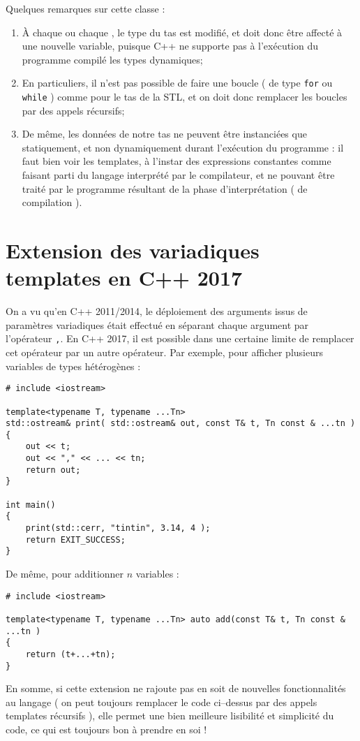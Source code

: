 \documentclass[a4]{article}
\begin{document}
Quelques remarques sur cette classe :
\begin{enumerate}
\item À chaque \verb@pop@ ou chaque \verb@push@, le type du tas est modifié, et doit donc être affecté à une nouvelle variable, puisque
C++ ne supporte pas à l'exécution du programme compilé les types dynamiques;
\item En particuliers, il n'est pas possible de faire une boucle ( de type \verb$for$ ou \verb$while$ ) comme pour le tas de la STL,
et on doit donc remplacer les boucles par des appels récursifs;
\item De même, les données de notre tas ne peuvent être instanciées que statiquement, et non dynamiquement durant l'exécution du programme :
il faut bien voir les templates, à l'instar des expressions constantes comme faisant parti du langage interprété par le compilateur, et ne
pouvant être traité par le programme résultant de la phase d'interprétation ( de compilation ). 
\end{enumerate}

\section{Extension des variadiques templates en C++ 2017}

On a vu qu'en C++ 2011/2014, le déploiement des arguments issus de paramètres variadiques était effectué en séparant chaque argument
par l'opérateur \verb$,$. En C++ 2017, il est possible dans une certaine limite de remplacer cet opérateur par un autre opérateur.
Par exemple, pour afficher plusieurs variables de types hétérogènes :
\begin{lstlisting}
# include <iostream>

template<typename T, typename ...Tn>
std::ostream& print( std::ostream& out, const T& t, Tn const & ...tn )
{
    out << t;
    out << "," << ... << tn;
    return out;
}

int main()
{
    print(std::cerr, "tintin", 3.14, 4 );
    return EXIT_SUCCESS;
}
\end{lstlisting}

De même, pour additionner $n$ variables :
\begin{lstlisting}
# include <iostream>

template<typename T, typename ...Tn> auto add(const T& t, Tn const & ...tn )
{
    return (t+...+tn);
}    
\end{lstlisting}

En somme, si cette extension ne rajoute pas en soit de nouvelles fonctionnalités au langage ( on peut toujours remplacer le code ci--dessus par des appels templates récursifs ), elle permet une bien meilleure lisibilité et simplicité du code, ce qui est
toujours bon à prendre en soi !
\end{document}
